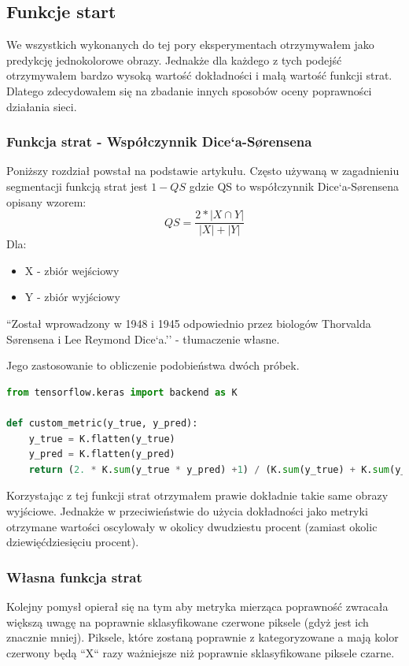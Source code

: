 \documentclass{article}
\begin{document}
\subsection{Funkcje start}
We wszystkich wykonanych do tej pory eksperymentach otrzymywałem jako predykcję jednokolorowe obrazy.
Jednakże dla każdego z tych podejść otrzymywałem bardzo wysoką wartość dokładności i małą wartość funkcji strat.
Dlatego zdecydowałem się na zbadanie innych sposobów oceny poprawności działania sieci.
\subsubsection{Funkcja strat - Współczynnik Dice`a-Sørensena}
Poniższy rozdział powstał na podstawie artykułu\cite{coefficient}.
Często używaną w zagadnieniu segmentacji funkcją strat jest $1-QS$ gdzie QS to współczynnik Dice`a-Sørensena opisany wzorem:
\begin{equation}
    QS = \frac{2*|X \cap Y|}{|X|+|Y|}
\end{equation}
Dla:
\begin{itemize}
    \item X - zbiór wejściowy
    \item Y - zbiór wyjściowy
\end{itemize}

``Został wprowadzony w 1948 i 1945 odpowiednio przez biologów Thorvalda Sørensena i Lee Reymond Dice`a.''\cite{coefficient} - tłumaczenie własne.

Jego zastosowanie to obliczenie podobieństwa dwóch próbek.

\begin{lstlisting}[caption={Implementacja przy użyciu Keras i TensorFlow},language=python]
from tensorflow.keras import backend as K

def custom_metric(y_true, y_pred):
    y_true = K.flatten(y_true)
    y_pred = K.flatten(y_pred)
    return (2. * K.sum(y_true * y_pred) +1) / (K.sum(y_true) + K.sum(y_pred) + 1)
\end{lstlisting}

Korzystając z tej funkcji strat otrzymałem prawie dokładnie takie same obrazy wyjściowe.
Jednakże w przeciwieństwie do użycia dokładności jako metryki otrzymane wartości oscylowały w okolicy dwudziestu procent (zamiast okolic dziewięćdziesięciu procent).

\subsubsection{Własna funkcja strat}
Kolejny pomysł opierał się na tym aby metryka mierząca poprawność zwracała większą uwagę na poprawnie sklasyfikowane czerwone piksele (gdyż jest ich znacznie mniej).
Piksele, które zostaną poprawnie z kategoryzowane a mają kolor czerwony będą ``X`` razy ważniejsze niż poprawnie sklasyfikowane piksele czarne.
\end{document}
